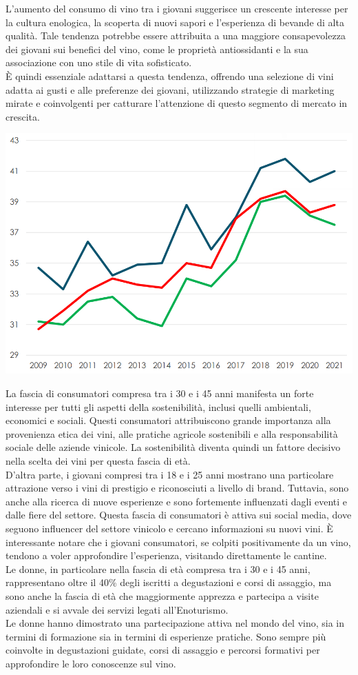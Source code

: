 \documentclass[12pt, a4paper]{article}
\newcommand{\meskip}{\medskip \\}
\begin{document}
L'aumento del consumo di vino tra i giovani suggerisce un crescente interesse per la cultura enologica, la scoperta di nuovi sapori e l'esperienza di bevande di alta qualità. Tale tendenza potrebbe essere attribuita a una maggiore consapevolezza dei giovani sui benefici del vino, come le proprietà antiossidanti e la sua associazione con uno stile di vita sofisticato.\meskip
È quindi essenziale adattarsi a questa tendenza, offrendo una selezione di vini adatta ai gusti e alle preferenze dei giovani, utilizzando strategie di marketing mirate e coinvolgenti per catturare l'attenzione di questo segmento di mercato in crescita.\smallskip
\begin{center}
    \includegraphics[width=.85\textwidth]{images/consumo_vino_eta.png}
\end{center}
La fascia di consumatori compresa tra i 30 e i 45 anni manifesta un forte interesse per tutti gli aspetti della sostenibilità, inclusi quelli ambientali, economici e sociali. Questi consumatori attribuiscono grande importanza alla provenienza etica dei vini, alle pratiche agricole sostenibili e alla responsabilità sociale delle aziende vinicole. La sostenibilità diventa quindi un fattore decisivo nella scelta dei vini per questa fascia di età.\meskip
D'altra parte, i giovani compresi tra i 18 e i 25 anni mostrano una particolare attrazione verso i vini di prestigio e riconosciuti a livello di brand. Tuttavia, sono anche alla ricerca di nuove esperienze e sono fortemente influenzati dagli eventi e dalle fiere del settore. Questa fascia di consumatori è attiva sui social media, dove seguono influencer del settore vinicolo e cercano informazioni su nuovi vini. È interessante notare che i giovani consumatori, se colpiti positivamente da un vino, tendono a voler approfondire l'esperienza, visitando direttamente le cantine.\meskip
Le donne, in particolare nella fascia di età compresa tra i 30 e i 45 anni, rappresentano oltre il 40\% degli iscritti a degustazioni e corsi di assaggio, ma sono anche la fascia di età che maggiormente apprezza e partecipa a visite aziendali e si avvale dei servizi legati all'Enoturismo.\meskip
Le donne hanno dimostrato una partecipazione attiva nel mondo del vino, sia in termini di formazione sia in termini di esperienze pratiche. Sono sempre più coinvolte in degustazioni guidate, corsi di assaggio e percorsi formativi per approfondire le loro conoscenze sul vino.
\end{document}
